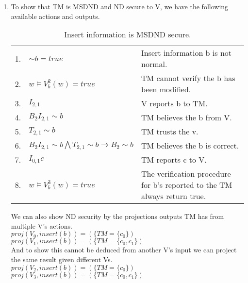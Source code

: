 \documentclass[journal,onecolumn]{IEEEtran}
\begin{document}
\begin{enumerate}
\begin{enumerate}
      \begin{enumerate}
        \item To show that TM is MSDND and ND secure to V, we have the following available actions and outputs.
        
        \begin{table}[H]
          \caption{Insert information is MSDND secure.}
          \centering
          \begin{tabular}{lll}
          1.  & ${\sim} b = true$          & Insert information b is not normal.                                                       \\
          2.  & $w \vDash V^2_b(w) = true$ & TM cannot verify the b has been modified.                                 \\
          3.  & $I_{2,1}$                 & V reports b to TM.                                                \\
          4.  & $B_2I_{2,1} {\sim} b$      & TM believes the b from V.                                     \\
          5.  & $T_{2,1} {\sim} b$         & TM trusts the v.                                                          \\
          6.  & $B_2I_{2,1} {\sim} b \bigwedge T_{2,1} {\sim} b \rightarrow B_2 {\sim} b$ & TM believes the b is correct.                                             \\
          7.  & $I_{0,1}c$                 & TM reports c to V.           \\
          8.  & $w \vDash V^3_b(w) = true$  & The verification procedure for b's reported to the TM always return true.
          \end{tabular}
        \end{table}

        We can also show ND security by the projections outputs TM has from multiple V's actions.\\

        $proj(V_0, insert(b)) = (\{TM = \{c_0\})$ \\
        $proj(V_1, insert(b)) = (\{TM = \{c_0, c_1\})$ \\
        

        And to show this cannot be deduced from another V's input we can project the same result given different Vs.\\
        
        $proj(V_2, insert(b)) = (\{TM = \{c_0\})$ \\
        $proj(V_3, insert(b)) = (\{TM = \{c_0, c_1\})$ \\


\end{enumerate}
\end{enumerate}
\end{enumerate}
\end{document}

